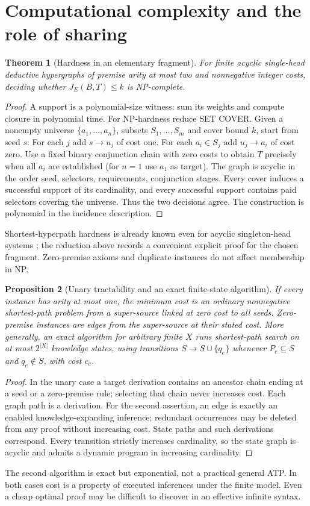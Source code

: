 \documentclass[11pt]{article}
\newtheorem{theorem}{Theorem}[section]
\newtheorem{proposition}[theorem]{Proposition}
\theoremstyle{remark}\newtheorem{remark}[theorem]{Remark}
\begin{document}
\section{Computational complexity and the role of sharing}
\begin{theorem}[Hardness in an elementary fragment]
For finite acyclic single-head deductive hypergraphs of premise arity at most two and nonnegative integer costs, deciding whether $J_E(B,T)\leq k$ is NP-complete.
\end{theorem}
\begin{proof}
A support is a polynomial-size witness: sum its weights and compute closure in polynomial time. For NP-hardness reduce SET COVER. Given a nonempty universe $\{a_1,\ldots,a_n\}$, subsets $S_1,\ldots,S_m$ and cover bound $k$, start from seed $s$. For each $j$ add $s\to u_j$ of cost one. For each $a_i\in S_j$ add $u_j\to a_i$ of cost zero. Use a fixed binary conjunction chain with zero costs to obtain $T$ precisely when all $a_i$ are established (for $n=1$ use $a_1$ as target). The graph is acyclic in the order seed, selectors, requirements, conjunction stages. Every cover induces a successful support of its cardinality, and every successful support contains paid selectors covering the universe. Thus the two decisions agree. The construction is polynomial in the incidence description.
\end{proof}
Shortest-hyperpath hardness is already known even for acyclic singleton-head systems \cite{heuristic}; the reduction above records a convenient explicit proof for the chosen fragment. Zero-premise axioms and duplicate instances do not affect membership in NP.

\begin{proposition}[Unary tractability and an exact finite-state algorithm]
If every instance has arity at most one, the minimum cost is an ordinary nonnegative shortest-path problem from a super-source linked at zero cost to all seeds. Zero-premise instances are edges from the super-source at their stated cost. More generally, an exact algorithm for arbitrary finite $X$ runs shortest-path search on at most $2^{|X|}$ knowledge states, using transitions $S\to S\cup\{q_e\}$ whenever $P_e\subseteq S$ and $q_e\notin S$, with cost $c_e$.
\end{proposition}
\begin{proof}
In the unary case a target derivation contains an ancestor chain ending at a seed or a zero-premise rule; selecting that chain never increases cost. Each graph path is a derivation. For the second assertion, an edge is exactly an enabled knowledge-expanding inference; redundant occurrences may be deleted from any proof without increasing cost. State paths and such derivations correspond. Every transition strictly increases cardinality, so the state graph is acyclic and admits a dynamic program in increasing cardinality.
\end{proof}
The second algorithm is exact but exponential, not a practical general ATP. In both cases cost is a property of executed inferences under the finite model. Even a cheap optimal proof may be difficult to discover in an effective infinite syntax.
\end{document}
